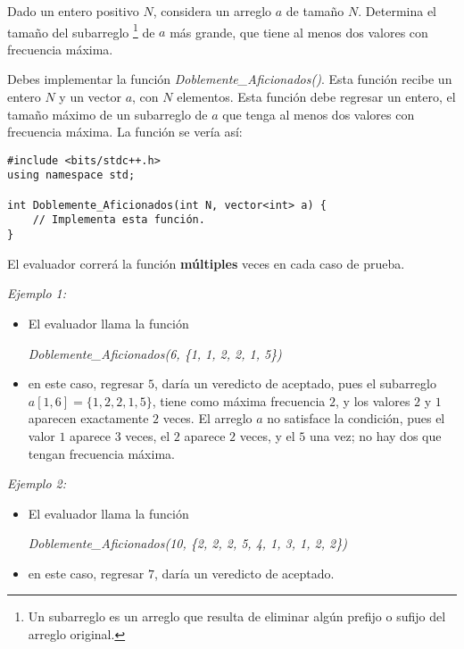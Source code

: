 \documentclass[12pt]{scrartcl}
\begin{document}
    
    
    \vspace{10pt}

    
    
        Dado un entero positivo $N$, considera un arreglo $a$ de tamaño $N$. Determina el tamaño del subarreglo \footnote{Un subarreglo es un arreglo que resulta de eliminar algún prefijo o sufijo del arreglo original.} de $a$ más grande, que tiene al menos dos valores con frecuencia máxima. 
    

       Debes implementar la función \textit{Doblemente\_Aficionados()}. Esta función recibe un entero $N$ y un vector $a$, con $N$ elementos. Esta función debe regresar un entero, el tamaño máximo de un subarreglo de $a$ que tenga al menos dos valores con frecuencia máxima.
        La función se vería así:

\begin{verbatim}
#include <bits/stdc++.h>
using namespace std;

int Doblemente_Aficionados(int N, vector<int> a) {
    // Implementa esta función.
}
\end{verbatim}

    El evaluador correrá la función \textbf{múltiples} veces en cada caso de prueba.

    
        {\itshape Ejemplo 1:}
        \begin{itemize}
            \item El evaluador llama la función 

            \begin{center}
                {\itshape Doblemente\_Aficionados(6, \{1, 1, 2, 2, 1, 5\})}
            \end{center}
            
            \item en este caso, regresar $5$, daría un veredicto de aceptado, pues el subarreglo $a[1, 6] = \{1, 2, 2, 1, 5\}$, tiene como máxima frecuencia $2$, y los valores $2$ y $1$ aparecen exactamente $2$ veces. El arreglo $a$ no satisface la condición, pues el valor $1$ aparece $3$ veces, el $2$ aparece $2$ veces, y el $5$ una vez; no hay dos que tengan frecuencia máxima. 
        \end{itemize}
        
        {\itshape Ejemplo 2:}
        \begin{itemize}
            \item El evaluador llama la función 
            
            \begin{center}
                {\itshape Doblemente\_Aficionados(10, \{2, 2, 2, 5, 4, 1, 3, 1, 2, 2\})}
            \end{center}

            \item en este caso, regresar $7$, daría un veredicto de aceptado.
        \end{itemize}
        
\end{document}
